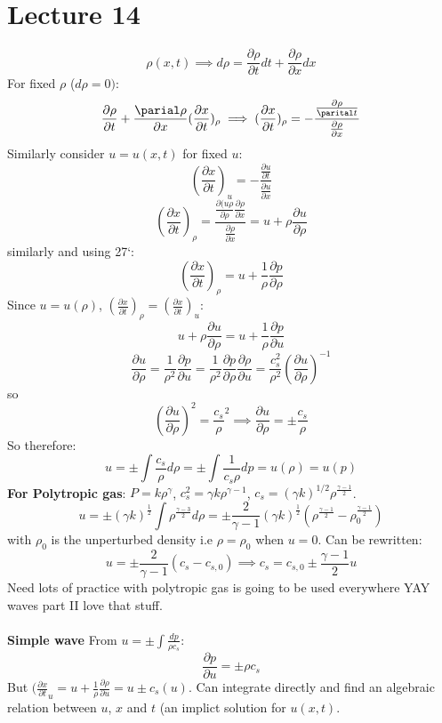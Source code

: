 \documentclass{article}
\begin{document}
\section{Lecture 14}
$$
\rho(x,t) \implies d\rho = \frac{\partial \rho}{\partial t} dt + \frac{\partial \rho}{\partial x} dx
$$
For fixed $\rho$ ($d \rho = 0)$:
$$
\frac{\partial \rho}{\partial t} + \frac{\parial \rho}{\partial x} (\frac{\partial x}{\partial t})_{\rho} \implies (\frac{\partial x}{\partial t})_{\rho} = - \frac{\frac{\partial \rho}{\parital t}}{\frac{\partial \rho}{\partial x}}
$$
Similarly consider $u= u(x,t)$ for fixed $u$:
$$ (\frac{\partial x}{\partial t})_{u} = - \frac{\frac{\partial u}{\partial t}}{\frac{\partial u}{\partial x}}
$$
$$
(\frac{\partial x}{\partial t} )_{\rho} = \frac{\frac{\partial(u \rho}{\partial \rho}\frac{\partial \rho}{\partial x}}{\frac{\partial \rho}{\partial x}} = u + \rho \frac{\partial u}{\partial \rho}
$$
similarly and using 27`:
$$
(\frac{\partial x}{\partial t} )_{\rho} = u + \frac{1}{\rho} \frac{\partial p}{\partial \rho}
$$
Since $u= u(\rho)$, $(\frac{\partial x}{\partial t})_{\rho}=(\frac{\partial x}{\partial t})_{u}$:
$$
u + \rho \frac{\partial u}{\partial \rho} = u + \frac{1}{\rho} \frac{\partial p}{\partial u}
$$
$$
\frac{\partial u}{\partial \rho} = \frac{1}{\rho^2} \frac{\partial p}{\partial u} = \frac{1}{\rho^2} \frac{\partial p }{\partial \rho} \frac{\partial \rho}{\partial u} = \frac{c_s^2}{\rho^2}(\frac{\partial u}{\partial \rho})^{-1}
$$
so
$$
(\frac{\partial u}{\partial \rho})^2 = \frac{c_s}{\rho}^2 \implies \frac{\partial u}{\partial \rho} = \pm \frac{c_s}{\rho}
$$
So therefore:
$$
u = \pm \int \frac{c_s}{\rho} d\rho = \pm \int \frac{1}{c_s\rho} dp = u(\rho) = u(p)
$$
\textbf{For Polytropic gas}: $P = k \rho^{\gamma}$, $c_s^2 = \gamma k \rho^{\gamma -1}$, $c_s = (\gamma k)^{1/2} \rho^{\frac{\gamma -1}{2}}$. 
$$
u = \pm (\gamma k)^{\frac{1}{2}} \int \rho^{\frac{\gamma -3}{2}} d\rho = \pm \frac{2}{\gamma -1} (\gamma k)^{\frac{1}{2}}( \rho^{\frac{\gamma -1}{2}} - \rho_0^{\frac{\gamma -1}{2}})
$$
with $\rho_0$ is the unperturbed density i.e $\rho = \rho_0$ when $u=0$. Can be rewritten:
$$
u = \pm \frac{2}{\gamma -1}( c_s - c_{s,0}) \implies c_s = c_{s,0} \pm \frac{\gamma -1}{2} u
$$
Need lots of practice with polytropic gas is going to be used everywhere YAY waves part II love that stuff.\\\\
\textbf{Simple wave}
From $u= \pm \int \frac{dp}{\rho c_s}$:
$$
\frac{\partial p}{\partial u} = \pm \rho c_s
$$
But $(\frac{\partial x}{\partial t}_u = u + \frac{1}{\rho} \frac{\partial \rho}{\partial u} = u \pm c_s(u)$. Can integrate directly and find an algebraic relation between $u$, $x$ and $t$ (an implict solution for $u(x,t)$.
\end{document}

